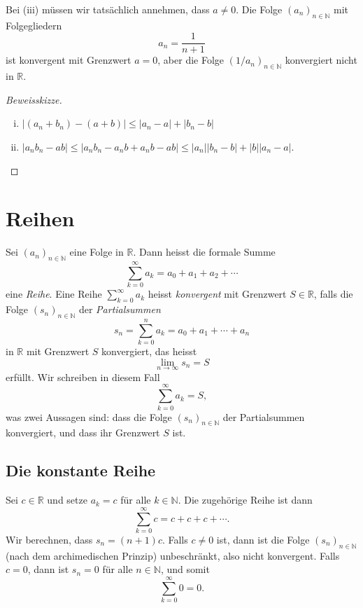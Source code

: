 \documentclass[../main.tex]{subfiles}
\begin{document}
\begin{remark}
Bei (iii) müssen wir tatsächlich annehmen,
dass $a \neq 0$. Die Folge ${(a_n)}_{n \in \mathbb{N}}$ 
mit Folgegliedern
\[
  a_n = \frac{1}{n+1}
\]
ist konvergent mit Grenzwert $a = 0$, aber die Folge
${(1/a_n)}_{n \in \mathbb{N}}$ konvergiert nicht in $\mathbb{R}$.
\end{remark}

\begin{proof}[Beweisskizze]
  \leavevmode
  \begin{enumerate}[(i)]
    \item $|(a_n + b_n) - (a + b)| \leq |a_n - a| + |b_n - b|$
    \item $|a_n b_n - ab| \leq 
      {|a_n b_n - a_n b + a_n b - ab |}
      \leq |a_n| |b_n - b| + |b||a_n -a|$. \qedhere
  \end{enumerate}
\end{proof}


\section{Reihen}
\begin{definition}
  Sei ${(a_{n})}_{n \in \mathbb{N}}$ eine Folge in $\mathbb{R}$.
  Dann heisst die formale Summe
  \[
    \sum_{k=0}^{\infty} a_k = a_0 + a_1 + a_2 + \cdots
  \]
  eine \emph{Reihe}. Eine Reihe
  $
    \sum_{k=0}^{\infty} a_k
  $
  heisst \emph{konvergent} mit Grenzwert $S \in \mathbb{R}$,
  falls die Folge ${(s_{n})}_{n \in \mathbb{N}}$ der
  \emph{Partialsummen}
  \[
    s_n = \sum_{k=0}^{n} a_k = a_0 + a_1 + \cdots + a_n
  \]
  in $\mathbb{R}$ mit Grenzwert $S$ konvergiert, das heisst
  \[
    \lim_{n \to \infty} s_n = S
  \]
  erfüllt. Wir schreiben in diesem Fall
  \[
    \sum_{k=0}^{\infty} a_k = S,
  \]
  was zwei Aussagen sind: dass die Folge ${(s_{n})}_{n \in \mathbb{N}}$ der Partialsummen konvergiert, und dass
  ihr Grenzwert $S$ ist.
\end{definition}

\subsection*{Die konstante Reihe}
Sei $c \in \mathbb{R}$ und setze $a_k = c$ für alle 
$k \in \mathbb{N}$.
Die zugehörige Reihe ist dann
 \[
  \sum_{k=0}^{\infty} c = c + c + c + \cdots.
\]
Wir berechnen, dass $s_n = (n+1)c$.
Falls $c \neq 0$ ist, dann ist die Folge
${(s_{n})}_{n \in \mathbb{N}}$ (nach dem
archimedischen Prinzip) unbeschränkt,
also nicht konvergent. Falls $c = 0$,
dann ist $s_n = 0$ für alle $n \in \mathbb{N}$,
und somit
\[
  \sum_{k=0}^{\infty} 0 = 0.
\]
\end{document}
